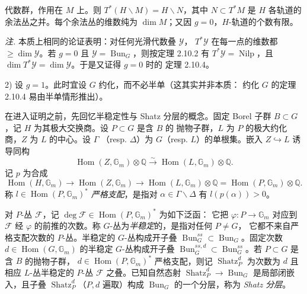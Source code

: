代数群，作用在 $M$ 上。则 $T^{*}(H\backslash M)=H\backslash N$，其中
$N\subset T^{*}M$ 是 $H$ 各轨道的余法丛之并。每个余法丛的维数纯为
$\dim M$；又因 $g=0$，$H$-轨道的个数有限。

\emph{注.} 本质上相同的论证表明：对任何光滑代数叠 $\mathcal{Y}$，
$T^{*}\mathcal{Y}$ 在每一点的维数都 $\ge\dim\mathcal{Y}$。若
$g=0$ 且 $\mathcal{Y}=\operatorname{Bun}_G$，则按定理 2.10.2 有
$T^{*}\mathcal{Y}=\operatorname{Nilp}$，且
$\dim T^{*}\mathcal{Y}=\dim\mathcal{Y}$。于是又证得 $g=0$ 时的
定理 2.10.4。

2) 设 $g=1$。此时宜设 $G$ 约化，而不必半单（这其实并非本质：
约化 $G$ 的定理 2.10.4 易由半单情形推出）。

在进入证明之前，先回忆半稳定性与 Shatz 分层的概念。固定 Borel 子群
$B\subset G$，记 $H$ 为其极大交换商。设 $P\subset G$ 是含 $B$ 的
抛物子群，$L$ 为 $P$ 的极大约化商，$Z$ 为 $L$ 的中心。设 $\Gamma$
（resp. $\Delta$）为 $G$（resp. $L$）的单根集。嵌入
$Z\hookrightarrow L$ 诱导同构
\[
  \operatorname{Hom}(Z,\mathbb{G}_m)\otimes\mathbb{Q}
  \xrightarrow{\sim}
  \operatorname{Hom}(L,\mathbb{G}_m)\otimes\mathbb{Q}.
\]
记 $p$ 为合成
\[
  \operatorname{Hom}(H,\mathbb{G}_m)\to
  \operatorname{Hom}(Z,\mathbb{G}_m)\to
  \operatorname{Hom}(L,\mathbb{G}_m)\otimes\mathbb{Q}
  =\operatorname{Hom}(P,\mathbb{G}_m)\otimes\mathbb{Q}.
\]
称 $l\in\operatorname{Hom}(P,\mathbb{G}_m)^{*}$ \emph{严格支配}，是指对
$\alpha\in\Gamma\backslash\Delta$ 有 $l(p(\alpha))>0$。

对 $P$-丛 $\mathcal{F}$，记
$\deg\mathcal{F}\in\operatorname{Hom}(P,\mathbb{G}_m)^{*}$ 为如下泛函：
它把 $\varphi:P\to\mathbb{G}_m$ 对应到 $\mathcal{F}$ 经 $\varphi$
的前推的次数。称 $G$-丛为\emph{半稳定}的，是指对任何 $P\ne G$，
它都不来自严格支配次数的 $P$-丛。半稳定的 $G$-丛构成开子叠
$\operatorname{Bun}_G^{ss}\subset\operatorname{Bun}_G$。固定次数
$d\in\operatorname{Hom}(G,\mathbb{G}_m)$ 的半稳定 $G$-丛构成开子叠
$\operatorname{Bun}_G^{ss,d}\subset\operatorname{Bun}_G^{ss}$。若
$P\subset G$ 是含 $B$ 的抛物子群，
$d\in\operatorname{Hom}(P,\mathbb{G}_m)^{*}$ 严格支配，则记
$\operatorname{Shatz}_P^d$ 为次数为 $d$ 且相应 $L$-丛半稳定的
$P$-丛 $\mathcal{F}$ 之叠。已知自然态射
$\operatorname{Shatz}_P^d\to\operatorname{Bun}_G$ 是局部闭嵌入，且子叠%
$\operatorname{Shatz}_P^d$（$P,d$ 遍取）构成 $\operatorname{Bun}_G$
的一个分层，称为 \emph{Shatz 分层}。

